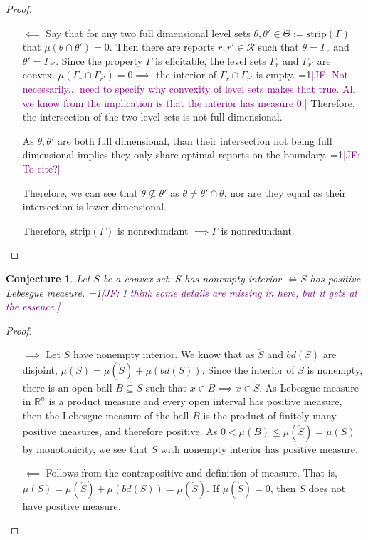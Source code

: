 \documentclass[12pt]{article}
\newcommand{\Comments}{1}
\newcommand{\mynote}[2]{\ifnum\Comments=1\textcolor{#1}{#2}\fi}
\newcommand{\jessie}[1]{\mynote{purple}{[JF: #1]}}
\newcommand{\reals}{\mathbb{R}}
\newcommand{\R}{\mathcal{R}}
\newcommand{\inter}[1]{\mathring{#1}}%
\newcommand{\strip}{\mathrm{strip}}
\newtheorem{conjecture}{Conjecture}
\begin{document}
\begin{proof}
\begin{enumerate}
		
		\item[$\impliedby$] 
		Say that for any two full dimensional level sets $\theta, \theta' \in \Theta := \strip(\Gamma)$ that $\mu(\theta \cap \theta') = 0$.
		Then there are reports $r, r' \in \R$ such that $\theta = \Gamma_r$ and $\theta' = \Gamma_{r'}$.
		Since the property $\Gamma$ is elicitable, the level sets $\Gamma_r$ and $\Gamma_{r'}$ are convex.
		$\mu(\Gamma_r \cap \Gamma_{r'}) = 0 \implies$ the interior of $\Gamma_r \cap \Gamma_{r'}$ is empty.
		\jessie{Not necessarily... need to specify why convexity of level sets makes that true.
		All we know from the implication is that the interior has measure 0.}
		Therefore, the intersection of the two level sets is not full dimensional.
		
		As $\theta, \theta'$ are both full dimensional, than their intersection not being full dimensional implies they only share optimal reports on the boundary. \jessie{To cite?}
		
		Therefore, we can see that $\theta \not \subseteq \theta'$ as $\theta \neq \theta' \cap \theta$, nor are they equal as their intersection is lower dimensional.
		
		Therefore, $\strip(\Gamma)$ is nonredundant $\implies \Gamma$ is nonredundant.
	\end{enumerate}
	
\end{proof}


\begin{conjecture}\label{conj:pos-measure-iff-nonempty-int}
Let $S$ be a convex set.
$S$ has nonempty interior $\iff S$ has positive Lebesgue measure.
\jessie{I think some details are missing in here, but it gets at the essence.}
\end{conjecture}
\begin{proof}

\begin{enumerate}
\item[$\implies$]
Let $S$ have nonempty interior.
We know that as $\inter{S}$ and $bd(S)$ are disjoint, $\mu(S) = \mu(\inter{S}) + \mu(bd(S))$.
Since the interior of $S$ is nonempty, there is an open ball $B \subseteq S$ such that $x \in B \implies x \in \inter S$.
As Lebesgue measure in $\reals^n$ is a product measure and every open interval has positive measure, then the Lebesgue measure of the ball $B$ is the product of finitely many positive measures, and therefore positive.
As $0 < \mu(B) \leq \mu(\inter S) = \mu(S)$ by monotonicity, we see that $S$ with nonempty interior has positive measure.

\item[$\impliedby$]  Follows from the contrapositive and definition of measure.
That is, $\mu(S) = \mu(\inter{S}) + \mu(bd(S)) = \mu(\inter{S})$.
If $\mu(\inter{S}) = 0$, then $S$ does not have positive measure.
\end{enumerate}
\end{proof}
\end{document}
